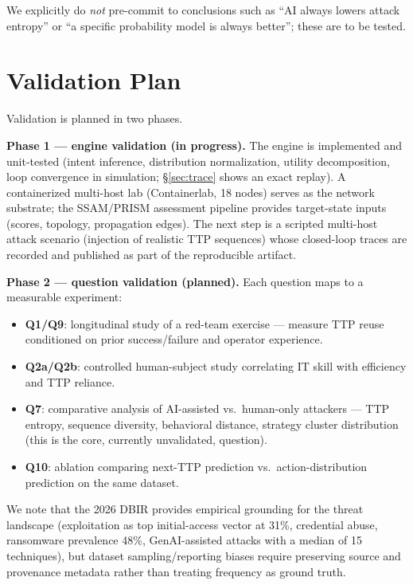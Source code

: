 \documentclass[11pt]{article}
\begin{document}
We explicitly do \textit{not} pre-commit to conclusions such as ``AI always
lowers attack entropy'' or ``a specific probability model is always
better''; these are to be tested.

\section{Validation Plan}
\label{sec:validation}

Validation is planned in two phases.

\textbf{Phase 1 --- engine validation (in progress).} The engine is
implemented and unit-tested (intent inference, distribution normalization,
utility decomposition, loop convergence in simulation;
\S\ref{sec:trace} shows an exact replay). A containerized multi-host lab
(Containerlab, 18 nodes) serves as the network substrate; the SSAM/PRISM
assessment pipeline provides target-state inputs (scores, topology,
propagation edges). The next step is a scripted multi-host attack scenario
(injection of realistic TTP sequences) whose closed-loop traces are
recorded and published as part of the reproducible artifact.

\textbf{Phase 2 --- question validation (planned).} Each question maps
to a measurable experiment:
\begin{itemize}
\item \textbf{Q1/Q9}: longitudinal study of a red-team exercise --- measure
      TTP reuse conditioned on prior success/failure and operator
      experience.
\item \textbf{Q2a/Q2b}: controlled human-subject study correlating IT skill
      with efficiency and TTP reliance.
\item \textbf{Q7}: comparative analysis of AI-assisted vs.\ human-only
      attackers --- TTP entropy, sequence diversity, behavioral distance,
      strategy cluster distribution (this is the core, currently
      unvalidated, question).
\item \textbf{Q10}: ablation comparing next-TTP prediction vs.\
      action-distribution prediction on the same dataset.
\end{itemize}
We note that the 2026 DBIR \cite{dbir2026} provides empirical grounding for
the threat landscape (exploitation as top initial-access vector at 31\%,
credential abuse, ransomware prevalence 48\%, GenAI-assisted attacks with a
median of 15 techniques), but dataset sampling/reporting biases require
preserving source and provenance metadata rather than treating frequency as
ground truth.
\end{document}
